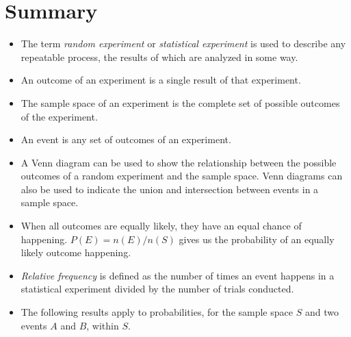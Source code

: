             \section{ Summary}
            \nopagebreak
            \label{m39373*eip-106}\begin{itemize}[noitemsep]
            \item The
term \textsl{random experiment} or \textsl{statistical experiment} is used to describe any
repeatable process, the results of which are analyzed in some way.\item 
An outcome of an experiment is a single result of that experiment.\item 
The sample space of an experiment is the complete set of possible outcomes of
the experiment.\item 
An event is any set of outcomes of an experiment.\item 
A Venn diagram can be used to show the relationship between the possible
outcomes of a random experiment and the sample space. Venn diagrams can also be
used to indicate the union and intersection between events in a sample space.
\item 
When all outcomes are equally likely, they have an equal chance of happening.
$P\left(E\right)=n\left(E\right)/n\left(S\right)$ gives us the
probability of an equally likely outcome happening.\item 
\textsl{Relative frequency} is defined as the
number of times an event happens in a statistical experiment divided by the
number of trials conducted.\item The following results apply to probabilities, for the sample space $S$ and two events \begin{math}A\end{math} and \begin{math}B\end{math}, within \begin{math}S\end{math}.
      \label{m39373*uid3457}\nopagebreak\noindent{}
\end{itemize}
